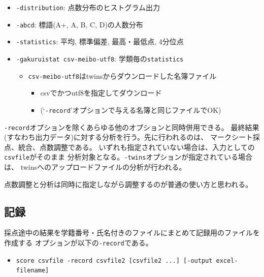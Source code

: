 \begin{itemize}
\item \texttt{-distribution}: 点数分布のヒストグラム出力

\item \texttt{-abcd}: 標語(A+, A, B, C, D)の人数分布

\item \texttt{-statistics}: 平均, 標準偏差, 最高・最低点, 4分位点

\item \texttt{-gakuruistat csv-meibo-utf8}: 学類毎の\texttt{statistics}

\begin{itemize}
\item \texttt{csv-meibo-utf8}はtwinsからダウンロードした名簿ファイル

\begin{itemize}
\item csvでかつutf8を指定してダウンロード

\item (`\texttt{-record}'オプションで与える名簿と同じファイルでOK)

\end{itemize}

\end{itemize}

\end{itemize}

\texttt{-record}オプションを除くあらゆる他のオプションと同時併用できる。
最終結果(すなわち出力データ)に対する分析を行う。先に行われるのは、
マークシート採点、統合、点数調整である。
いずれも指定されていない場合は、入力としての\texttt{csvfile}がそのまま
分析対象となる。\texttt{-twins}オプションが指定されている場合は、
twinsへのアップロードファイルの分析が行われる。

点数調整と分析は同時に指定しながら調整するのが普通の使い方と思われる。

\subsection{記録}
\label{記録}

採点途中の結果を学籍番号・氏名付きのファイルにまとめて記録用のファイルを作成する
オプションが以下の\texttt{-record}である。

\begin{itemize}
\item \texttt{score csvfile -record csvfile2 [csvfile2 ...] [-output excel-filename]}

\end{itemize}

